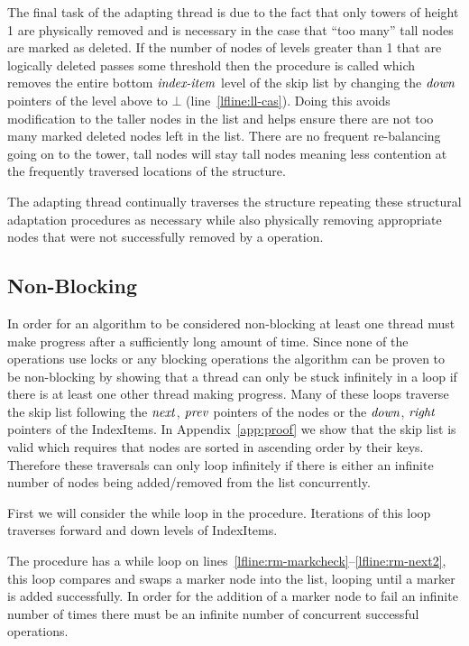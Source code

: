 The final task of the adapting thread is due to the fact
that only towers of height 1 are physically removed
and is necessary in the case that ``too many'' tall nodes are marked as deleted.
If the number of nodes of levels greater than 1 that are logically deleted 
passes some threshold then
the  procedure is called
 which removes the entire bottom $\ms{index-item}$ level of the skip list
by changing the $\ms{down}$ pointers of the level above to $\bot$ (line~\ref{lfline:ll-cas}).
Doing this avoids modification to the taller nodes in the list and helps ensure
there are not too many marked deleted nodes left in the list.
There are no frequent re-balancing going on to the tower, 
tall nodes will stay tall nodes meaning less contention
at the frequently traversed locations of the structure.

The adapting thread continually traverses the structure
repeating these structural adaptation procedures as necessary while also
physically removing appropriate nodes that were not
successfully removed by a  operation.

\subsection{Non-Blocking}\label{ssec:progress}

In order for an algorithm to be considered non-blocking at least one thread must make progress after a sufficiently long
amount of time.
Since none of the operations use locks or any blocking operations the algorithm can be proven to be non-blocking
by showing that a thread can only be stuck infinitely in a loop if there is at least one other thread making progress.
Many of these loops traverse the skip list following the $\ms{next}$, $\ms{prev}$ pointers of the nodes or the $\ms{down}$,
$\ms{right}$ pointers of the IndexItems.
In Appendix~\ref{app:proof} we show that the skip list is valid which requires that nodes are sorted in ascending order by their keys.
Therefore these traversals can only loop infinitely if there is either an infinite number of nodes being added/removed from
the list concurrently.

First we will consider the while loop in the  procedure.
Iterations of this loop traverses forward and down levels of IndexItems.

The  procedure has a while loop
on lines~\ref{lfline:rm-markcheck}--\ref{lfline:rm-next2}, this loop compares and swaps a marker node into the list, looping until a marker is added successfully.
In order for the addition of a marker node to fail an infinite number of times there must be an infinite number of concurrent successful
 operations.

